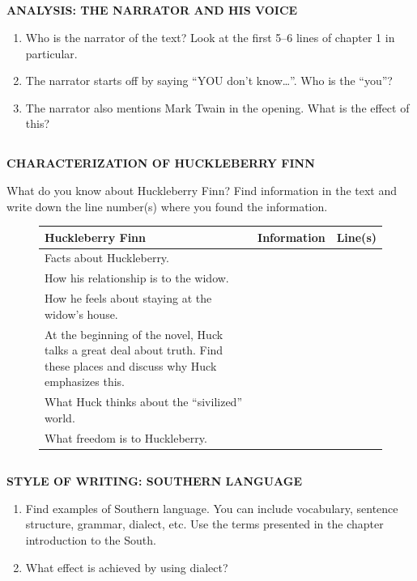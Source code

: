 \documentclass[10pt,a4paper,table]{article}
\newcommand{\qm}[1]{``#1''}
\begin{document}
\subsection{}
\textbf{ANALYSIS: THE NARRATOR AND HIS VOICE}
\begin{enumerate}[label=\arabic*., leftmargin=*]
  \item Who is the narrator of the text? Look at the first 5--6 lines of chapter 1 in particular.
  \item The narrator starts off by saying \qm{YOU don't know\ldots}. Who is the \qm{you}?
  \item The narrator also mentions Mark Twain in the opening. What is the effect of this?
\end{enumerate}

\clearpage

\subsection{}
\textbf{CHARACTERIZATION OF HUCKLEBERRY FINN}

What do you know about Huckleberry Finn? Find information in the text and write down the line number(s) where you found the information.

\begin{figure}[h!]
\centering\renewcommand{\arraystretch}{2.2}
\begin{tabularx}{0.98\textwidth}{|p{}|X|p{}|}
    \hline
    \cellcolor{frbgreenl}\textbf{Huckleberry Finn} & \cellcolor{frbgreenl}\textbf{Information} & \cellcolor{frbgreenl}\textbf{Line(s)}\\\hline
    Facts about Huckleberry. & & \\\hline
    How his relationship is to the widow. & & \\\hline
    How he feels about staying at the widow's house. & & \\\hline
    At the beginning of the novel, Huck talks a great deal about truth. Find these places and discuss why Huck emphasizes this. & & \\\hline
    What Huck thinks about the \qm{sivilized} world. & & \\\hline
    What freedom is to Huckleberry. & & \\\hline
\end{tabularx}
\end{figure}

\subsection{}
\textbf{STYLE OF WRITING: SOUTHERN LANGUAGE}
\begin{enumerate}[label=\arabic*., leftmargin=*]
  \item Find examples of Southern language. You can include vocabulary, sentence structure, grammar, dialect, etc. Use the terms presented in the chapter introduction to the South.
  \item What effect is achieved by using dialect?
\end{enumerate}
\end{document}
